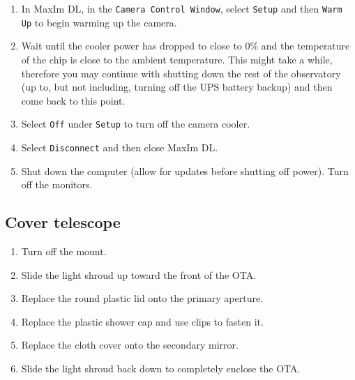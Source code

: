 \documentclass{article}
\begin{document}
	\begin{enumerate}
		
		\item In MaxIm DL, in the \texttt{Camera Control Window}, select \texttt{Setup} and then \texttt{Warm Up} to begin warming up the camera.
		
		\item Wait until the cooler power has dropped to close to 0\% and the temperature of the chip is close to the ambient temperature. This might take a while, therefore you may continue with shutting down the rest of the observatory (up to, but not including, turning off the UPS battery backup) and then come back to this point.
		
		\item Select \texttt{Off} under \texttt{Setup} to turn off the camera cooler.
		
		\item Select \texttt{Disconnect} and then close MaxIm DL.
		
		\item Shut down the computer (allow for updates before shutting off power). Turn off the monitors.
		
	\end{enumerate}
	
	\subsection{Cover telescope}
	\label{sec:cover-telescope}
	
	\begin{enumerate}
		
		\item Turn off the mount.
		
		\item Slide the light shroud up toward the front of the OTA.
		
		\item Replace the round plastic lid onto the primary aperture.
		
		\item Replace the plastic shower cap and use clips to fasten it.
		
		\item Replace the cloth cover onto the secondary mirror.
		
		\item Slide the light shroud back down to completely enclose the OTA.
		
	\end{enumerate}
	
\end{document}
